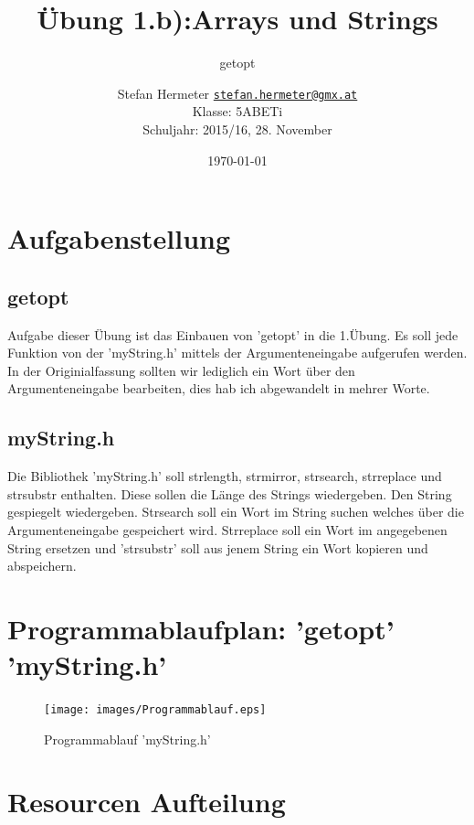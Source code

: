 \documentclass{scrartcl}
\newcommand{\mytitle}{Übung 1.b)}
\begin{document}
\title{\mytitle:Arrays und Strings}
\subtitle{getopt}
\date{\today}
\author{Stefan Hermeter \texttt{\href{mailto:stefan.hermeter@gmx.at}{stefan.hermeter@gmx.at}}\\
  Klasse: 5ABETi\\
  Schuljahr: 2015/16, 28. November}
\maketitle
{}
\newpage
\tableofcontents
\listoffigures
\newpage
{}
\section{Aufgabenstellung}
\subsection{getopt}
Aufgabe dieser Übung ist das Einbauen von 'getopt' in die 1.Übung. Es soll jede Funktion von der 'myString.h' mittels der Argumenteneingabe aufgerufen werden. In der Originialfassung sollten wir lediglich ein Wort über den Argumenteneingabe bearbeiten, dies hab ich abgewandelt in mehrer Worte.

\subsection{myString.h}
Die Bibliothek 'myString.h' soll strlength, strmirror, strsearch, strreplace und strsubstr enthalten. Diese sollen die Länge des Strings wiedergeben. Den String gespiegelt wiedergeben. Strsearch soll ein Wort im String suchen welches über die Argumenteneingabe gespeichert wird. Strreplace soll ein Wort im angegebenen String ersetzen und 'strsubstr' soll aus jenem String ein Wort kopieren und abspeichern.

\section{Programmablaufplan: 'getopt' 'myString.h'}
\begin{figure}[H]
  \centering
  \texttt{[image: images/Programmablauf.eps]}
  \caption{Programmablauf 'myString.h'}
  \label{fig:digraph}
\end{figure}

\newpage
\section{Resourcen Aufteilung}
\end{document}
